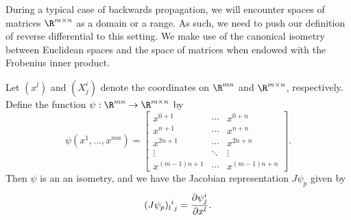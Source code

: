 During a typical case of backwards propagation, we will encounter spaces of matrices $\R^{m\times n}$ as a domain or a range.  As such, we need to push our definition of reverse differential to this setting.  We make use of the canonical isometry between Euclidean spaces and the space of matrices when endowed with the Frobenius inner product.

\begin{lem}
	Let $(x^l)$ and $(X^i_j)$ denote the coordinates on $\R^{mn}$ and $\R^{m\times n}$, respectively.  Define the function $\psi:\R^{mn}\to\R^{m\times n}$ by
	$$\psi(x^1,...,x^{mn})=\begin{bmatrix}
		x^{0+1}&\cdots &x^{0+n}\\
		x^{n+1}&\cdots &x^{n+n}\\
		x^{2n+1}&\cdots &x^{2n+n}\\
		\vdots &\ddots&\vdots\\
		x^{(m-1)n+1}&\cdots &x^{(m-1)n+n}
	\end{bmatrix}.$$
	Then $\psi$ is an an isometry, and we have the Jacobian representation $J\psi_p$ given by
	$$\tensor{(J\psi_p)}{_l^i_j}=\frac{\partial\psi^i_j}{\partial x^l}.$$
\end{lem}

